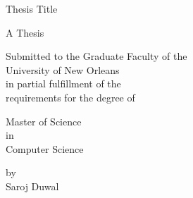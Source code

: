 \providecommand{\tabularnewline}{\\}
\begin{titlepage}
\begin{center}\large
Thesis Title
\vspace{5em}

A Thesis

\vspace{5em}

\begin{singlespace}

Submitted to the Graduate Faculty of the  \\
University of New Orleans \\
in partial fulfillment of the \\
requirements for the degree of
\end{singlespace}

\vspace{5em}
\begin{singlespace}
Master of Science \\
in \\
Computer Science
\end{singlespace}

\vspace{5em}
\par\end{center}
\begin{center}\large
\hspace{12pt} by \\
\hspace{12pt} Saroj Duwal \\


\par\end{center}
\end{titlepage}
\pagebreak{}




